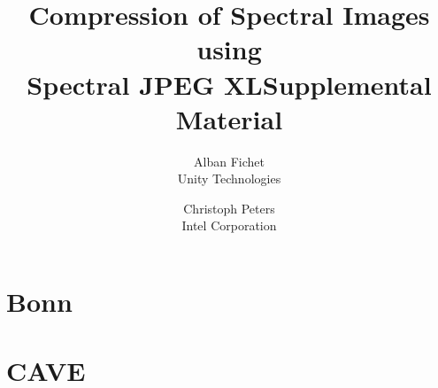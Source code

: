 \documentclass{article}
\author{Alban Fichet\\Unity Technologies \and Christoph Peters\\Intel Corporation}
\title{Compression of Spectral Images using\\Spectral JPEG XL\newline \newline \small{Supplemental Material}}
\date{}
\begin{document}
\maketitle

\tableofcontents
\clearpage



\section{Bonn}



\section{CAVE}


\end{document}
